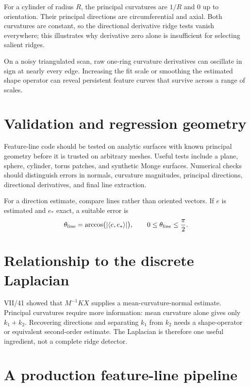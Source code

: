 \begin{example}\label{ex:vii42-cylinder}
For a cylinder of radius \(R\), the principal curvatures are \(1/R\) and \(0\)
up to orientation.  Their principal directions are circumferential and axial.
Both curvatures are constant, so the directional derivative ridge tests vanish
everywhere; this illustrates why derivative zero alone is insufficient for
selecting salient ridges.
\end{example}

\begin{example}\label{ex:vii42-noisy}
On a noisy triangulated scan, raw one-ring curvature derivatives can oscillate in
sign at nearly every edge.  Increasing the fit scale or smoothing the estimated
shape operator can reveal persistent feature curves that survive across a range
of scales.
\end{example}

\section{Validation and regression geometry}

Feature-line code should be tested on analytic surfaces with known principal
geometry before it is trusted on arbitrary meshes.  Useful tests include a
plane, sphere, cylinder, torus patches, and synthetic Monge surfaces.  Numerical
checks should distinguish errors in normals, curvature magnitudes, principal
directions, directional derivatives, and final line extraction.

For a direction estimate, compare lines rather than oriented vectors.  If
\(e\) is estimated and \(e_*\) exact, a suitable error is
\[
\theta_{\rm line}
=
\arccos\bigl(|\langle e,e_*\rangle|\bigr),
\qquad
0\le\theta_{\rm line}\le\frac\pi2.
\]

\section{Relationship to the discrete Laplacian}

VII/41 showed that \(M^{-1}KX\) supplies a mean-curvature-normal estimate.
Principal curvatures require more information: mean curvature alone gives only
\(k_1+k_2\).  Recovering directions and separating \(k_1\) from \(k_2\) needs a
shape-operator or equivalent second-order estimate.  The Laplacian is therefore
one useful ingredient, not a complete ridge detector.

\section{A production feature-line pipeline}

